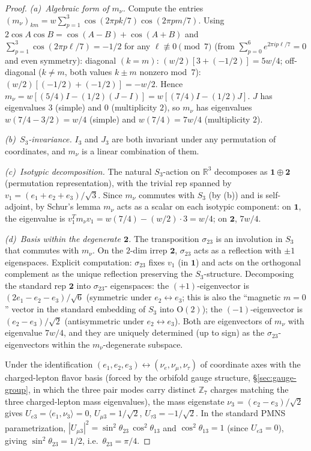 \begin{proof}
\emph{(a)~Algebraic form of $m_\nu$.}
Compute the entries $(m_\nu)_{km}
= w\sum_{p=1}^{3}\cos(2\pi pk/7)\cos(2\pi pm/7)$.
Using $2\cos A\cos B = \cos(A{-}B) + \cos(A{+}B)$ and
$\sum_{p=1}^{3}\cos(2\pi p\ell/7) = -1/2$
for any $\ell \not\equiv 0\pmod 7$
(from $\sum_{p=0}^{6}e^{2\pi ip\ell/7} = 0$ and even symmetry):
diagonal $(k=m)$: $(w/2)[3 + (-1/2)] = 5w/4$;
off-diagonal ($k \ne m$, both values $k{\pm}m$ nonzero mod~$7$):
$(w/2)[(-1/2) + (-1/2)] = -w/2$.
Hence $m_\nu = w[(5/4)I - (1/2)(J - I)] = w[(7/4)I - (1/2)J]$.
$J$ has eigenvalues $3$ (simple) and $0$ (multiplicity $2$),
so $m_\nu$ has eigenvalues $w(7/4 - 3/2) = w/4$ (simple) and
$w(7/4) = 7w/4$ (multiplicity $2$).

\emph{(b)~$S_3$-invariance.}
$I_3$ and $J_3$ are both invariant under any permutation of
coordinates, and $m_\nu$ is a linear combination of them.

\emph{(c)~Isotypic decomposition.}
The natural $S_3$-action on $\mathbb{R}^3$ decomposes as
$\mathbf{1} \oplus \mathbf{2}$ (permutation representation),
with the trivial rep spanned by $v_1 = (e_1+e_2+e_3)/\sqrt{3}$.
Since $m_\nu$ commutes with $S_3$ (by (b)) and is self-adjoint,
by Schur's lemma $m_\nu$ acts as a scalar on each isotypic
component: on $\mathbf{1}$, the eigenvalue is
$v_1^T m_\nu v_1 = w(7/4) - (w/2)\cdot 3 = w/4$;
on $\mathbf{2}$, $7w/4$.

\emph{(d)~Basis within the degenerate $\mathbf{2}$.}
The transposition $\sigma_{23}$ is an involution in $S_3$ that
commutes with $m_\nu$.
On the $2$-dim irrep $\mathbf{2}$, $\sigma_{23}$ acts as a
reflection with $\pm 1$ eigenspaces.
Explicit computation: $\sigma_{23}$ fixes $v_1$ (in $\mathbf{1}$)
and acts on the orthogonal complement as the unique reflection
preserving the $S_3$-structure.
Decomposing the standard rep $\mathbf{2}$ into $\sigma_{23}$-
eigenspaces:
the $(+1)$-eigenvector is $(2e_1 - e_2 - e_3)/\sqrt{6}$
(symmetric under $e_2 \leftrightarrow e_3$; this is also the
``magnetic $m=0$'' vector in the standard embedding of $S_3$
into $\mathrm{O}(2)$);
the $(-1)$-eigenvector is $(e_2 - e_3)/\sqrt{2}$
(antisymmetric under $e_2 \leftrightarrow e_3$).
Both are eigenvectors of $m_\nu$ with eigenvalue $7w/4$,
and they are uniquely determined (up to sign) as the
$\sigma_{23}$-eigenvectors within the $m_\nu$-degenerate
subspace.

Under the identification $(e_1, e_2, e_3) \leftrightarrow
(\nu_e, \nu_\mu, \nu_\tau)$ of coordinate axes with the
charged-lepton flavor basis
(forced by the orbifold gauge structure,
\S\ref{sec:gauge-group}, in which the three pair
modes carry distinct $\mathbb{Z}_7$ charges matching
the three charged-lepton mass eigenvalues),
the mass eigenstate $\nu_3 = (e_2 - e_3)/\sqrt{2}$ gives
$U_{e3} = \langle e_1, \nu_3\rangle = 0$,
$U_{\mu 3} = 1/\sqrt{2}$,
$U_{\tau 3} = -1/\sqrt{2}$.
In the standard PMNS parametrization,
$|U_{\mu 3}|^2 = \sin^2\theta_{23}\,\cos^2\theta_{13}$
and $\cos^2\theta_{13} = 1$ (since $U_{e3} = 0$),
giving $\sin^2\theta_{23} = 1/2$, i.e.\ $\theta_{23} = \pi/4$.


\end{proof}
